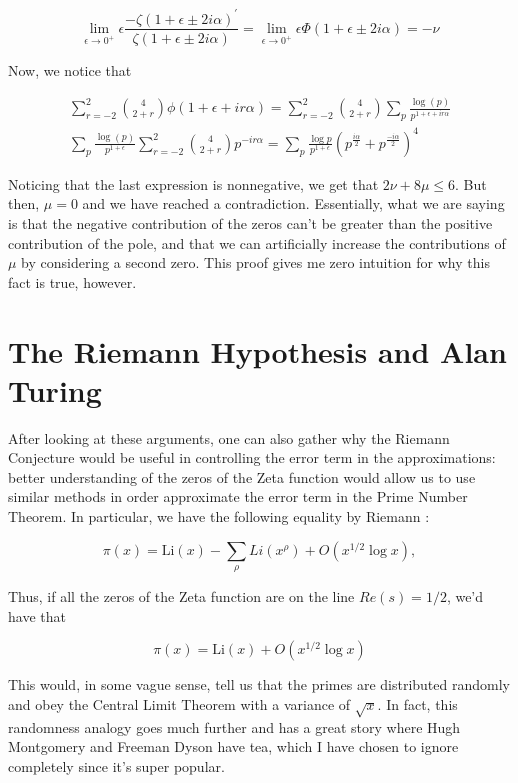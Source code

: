 \documentclass{article}
\theoremstyle{definition}
\begin{document}
\[ \lim_{\epsilon \to 0^{+}} \epsilon  \frac{-\zeta(1 + \epsilon \pm 2i\alpha)^{\prime}}{\zeta(1 + \epsilon \pm 2i\alpha)} = \lim_{\epsilon \to 0^{+}} \epsilon \Phi(1 + \epsilon \pm 2i\alpha) = - \nu \]

Now, we notice that 

\begin{align*}
    \sum_{r = - 2}^{2} \binom{4}{2 + r} \phi(1 + \epsilon + ir \alpha) = \sum_{r = - 2}^{2} \binom{4}{2 + r} \sum_{p} \frac{\log (p)}{p^{1 + \epsilon + ir \alpha}} \\
    \sum_{p} \frac{\log (p)}{p^{1 + \epsilon}} \sum_{r = - 2}^{2} \binom{4}{2 + r} p^{-ir \alpha} = 
    \sum_{p} \frac{\log p}{p^{1 + \epsilon}} (p^{\frac{i \alpha}{2}} + p^{\frac{- i \alpha}{2}})^{4}
\end{align*}

Noticing that the last expression is nonnegative, we get that $ 2 \nu + 8 \mu \leq 6 $.
But then, $ \mu = 0 $ and we have reached a contradiction.
Essentially, what we are saying is that the negative contribution of the zeros can't be greater
than the positive contribution of the pole, and that we can artificially increase
the contributions of $ \mu $ by considering a second zero. 
This proof gives me zero intuition for why this fact is true, however.

\section{The Riemann Hypothesis and Alan Turing}

After looking at these arguments, one can also gather why the Riemann Conjecture would
be useful in controlling the error term in the approximations: better understanding
of the zeros of the Zeta function would allow us to use similar methods in order approximate
the error term in the Prime Number Theorem. In particular, we have the following equality by 
Riemann \cite{princetonacademics_andrew_2012}:

\[ \pi(x) = \text{Li}(x) - \sum_{\rho} Li(x^{\rho}) + O(x^{1/2} \log x),\]

Thus, if all the zeros of the Zeta function are on the line $ Re(s) = 1/2 $,
we'd have that

\[ \pi(x) = \text{Li}(x) + O(x^{1/2} \log x) \]

This would, in some vague sense, tell us that the primes are distributed randomly and obey
the Central Limit Theorem with a variance of $ \sqrt{x} $. In fact, this randomness analogy goes much further and has a great story
where Hugh Montgomery and Freeman Dyson have tea, which I have chosen to ignore
completely since it's super popular.
\end{document}
